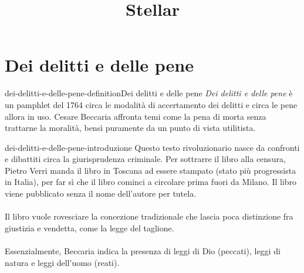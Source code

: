 \documentclass[preview]{standalone}
\begin{document}
\title{Stellar}
\genpage

\section{Dei delitti e delle pene}

\begin{snippetdefinition}{dei-delitti-e-delle-pene-definition}{Dei delitti e delle pene}
    \textit{Dei delitti e delle pene} è un pamphlet del 1764 circa
    le modalità di accertamento dei delitti e circa le pene allora in uso.
    Cesare Beccaria affronta temi come la pena di morta senza trattarne la moralità, bensì puramente
    da un punto di vista utilitista.
\end{snippetdefinition}

\begin{snippet}{dei-delitti-e-delle-pene-introduzione}
    Questo testo rivoluzionario nasce da confronti e dibattiti circa la giurisprudenza criminale.
    Per sottrarre il libro alla censura, Pietro Verri manda il libro in Toscana
    ad essere stampato (stato più progressista in Italia),
    per far sì che il libro cominci a circolare prima fuori da Milano.
    Il libro viene pubblicato senza il nome dell'autore per tutela.
    \\\\
    Il libro vuole rovesciare la concezione tradizionale che lascia poca distinzione fra giustizia e vendetta,
    come la legge del taglione.
    \\\\
    Essenzialmente, Beccaria indica la presenza di leggi di Dio (peccati), leggi di natura e leggi dell'uomo (reati).
\end{snippet}
\end{document}
